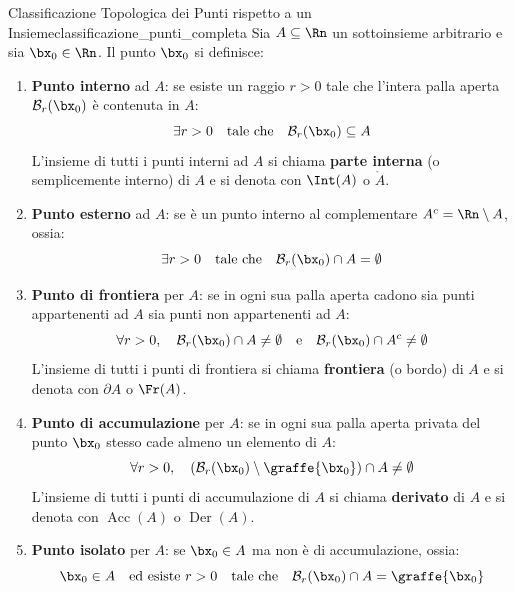 \begin{definizione}{Classificazione Topologica dei Punti rispetto a un Insieme}{classificazione_punti_completa}
Sia $A \subseteq \Rn$ un sottoinsieme arbitrario e sia $\bx_0 \in \Rn$. Il punto $\bx_0$ si definisce:
\begin{enumerate}
    \item \textbf{Punto interno} ad $A$: se esiste un raggio $r > 0$ tale che l'intera palla aperta $\mathcal{B}_r(\bx_0)$ è contenuta in $A$:
    \[
    \exists r > 0 \quad \text{tale che} \quad \mathcal{B}_r(\bx_0) \subseteq A
    \]
    L'insieme di tutti i punti interni ad $A$ si chiama \textbf{parte interna} (o semplicemente interno) di $A$ e si denota con $\Int(A)$ o $\mathring{A}$.
    
    \item \textbf{Punto esterno} ad $A$: se è un punto interno al complementare $A^c = \Rn \setminus A$, ossia:
    \[
    \exists r > 0 \quad \text{tale che} \quad \mathcal{B}_r(\bx_0) \cap A = \emptyset
    \]
    
    \item \textbf{Punto di frontiera} per $A$: se in ogni sua palla aperta cadono sia punti appartenenti ad $A$ sia punti non appartenenti ad $A$:
    \[
    \forall r > 0, \quad \mathcal{B}_r(\bx_0) \cap A \neq \emptyset \quad \text{e} \quad \mathcal{B}_r(\bx_0) \cap A^c \neq \emptyset
    \]
    L'insieme di tutti i punti di frontiera si chiama \textbf{frontiera} (o bordo) di $A$ e si denota con $\partial A$ o $\Fr(A)$.
    
    \item \textbf{Punto di accumulazione} per $A$: se in ogni sua palla aperta privata del punto $\bx_0$ stesso cade almeno un elemento di $A$:
    \[
    \forall r > 0, \quad \left( \mathcal{B}_r(\bx_0) \setminus \graffe{\bx_0} \right) \cap A \neq \emptyset
    \]
    L'insieme di tutti i punti di accumulazione di $A$ si chiama \textbf{derivato} di $A$ e si denota con $\operatorname{Acc}(A)$ o $\operatorname{Der}(A)$.
    
    \item \textbf{Punto isolato} per $A$: se $\bx_0 \in A$ ma non è di accumulazione, ossia:
    \[
    \bx_0 \in A \quad \text{ed esiste } r > 0 \quad \text{tale che} \quad \mathcal{B}_r(\bx_0) \cap A = \graffe{\bx_0}
    \]
\end{enumerate}
\end{definizione}

